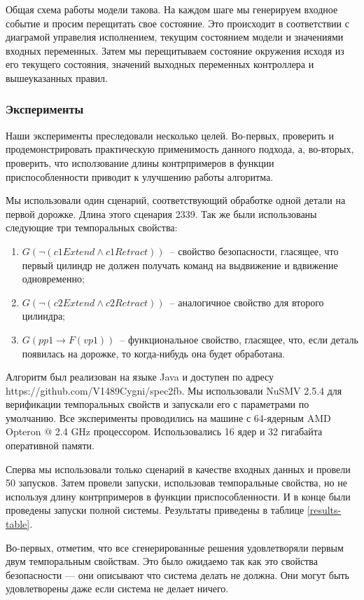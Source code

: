 \documentclass[14pt]{extarticle}
\theoremstyle{plain}
\theoremstyle{definition}
\begin{document}
Общая схема работы модели такова. На каждом шаге мы генерируем входное событие
и просим перещитать свое состояние. Это происходит в соответствии с диаграмой
управелия исполнением, текущим состоянием модели и значениями входных
переменных. Затем мы перещитываем состояние окружения исходя из его текущего
состояния, значений выходных переменных контроллера и вышеуказанных правил.

\subsubsection{Эксперименты}

Наши эксперименты преследовали несколько целей. Во-первых, проверить и
продемонстрировать практическую применимость данного подхода, а, во-вторых,
проверить, что исползование длины контрпримеров в функции приспособленности
приводит к улучшению работы алгоритма.

Мы использовали один сценарий, соответствующий обработке одной детали на
первой дорожке. Длина этого сценария 2339. Так же были использованы
следующие три темпоральных свойства:
\begin{enumerate}
    \item $G(\lnot (c1Extend \wedge c1Retract))$~-- свойство безопасности, гласящее, что
первый цилиндр не должен получать команд на выдвижение и вдвижение одновременно;
    \item $G(\lnot (c2Extend \wedge c2Retract))$~-- аналогичное свойство для второго цилиндра;
    \item $G(pp1 \rightarrow F(vp1))$~-- функциональное свойство, гласящее, что, если деталь
появилась на дорожке, то когда-нибудь она будет обработана.
\end{enumerate}

Алгоритм был реализован на языке Java и доступен по адресу https://github.com/V1489Cygni/spec2fb.
Мы использовали NuSMV 2.5.4 для верификации
темпоральных свойств и запускали его с параметрами по умолчанию. Все эксперименты
проводились на машине с 64-ядерным AMD Opteron @ 2.4 GHz процессором.
Использовались 16 ядер и 32 гигабайта оперативной памяти.

Сперва мы использовали только сценарий в качестве входных данных и провели 50 запусков.
Затем провели запуски, использовав темпоральные свойства, но не используя длину
контрпримеров в функции приспособленности. И в конце были проведены запуски полной
системы. Результаты приведены в таблице \ref{results-table}.

Во-первых, отметим, что все сгенерированные решения удовлетворяли первым двум
темпоральным свойствам. Это было ожидаемо так как это свойства безопасности ---
они описывают что система делать не должна. Они могут быть удовлетворены даже
если система не делает ничего.
\end{document}
